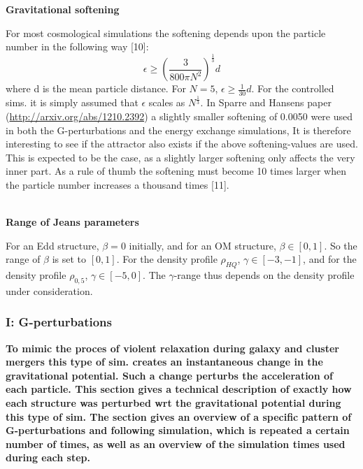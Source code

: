 \centerline{\textbf{Gravitational softening}} 
For most cosmological simulations the softening depends upon the particle number in the following way [10]:
\begin{equation}
\epsilon \geq (\frac{3}{800\pi N^2})^{\frac{1}{3}}d  
\end{equation}
where d is the mean particle distance. For $N=5$, $\epsilon \geq \frac{1}{30}d$. For the controlled sims. it is simply assumed that $\epsilon$ scales as $N^{\frac{1}{3}}$. In Sparre and Hansens paper (\url{http://arxiv.org/abs/1210.2392}) a slightly smaller softening of 0.0050 were used in both the G-perturbations and the energy exchange simulations, It is therefore interesting to see if the attractor also exists if the above softening-values are used. This is expected to be the case, as a slightly larger softening only affects the very inner part. As a rule of thumb the softening must become 10 times larger when the particle number increases a thousand times [11]. \\ \\

\centerline{\textbf{Range of Jeans parameters}} 
For an Edd structure, $\beta = 0$ initially, and for an OM structure, $\beta \in [0,1]$. So the range of $\beta$ is set to $[0,1]$. For the density profile $\rho_{HQ}$, $\gamma \in [-3,-1]$, and for the density profile $\rho_{0,5}$, $\gamma \in [-5,0]$. The $\gamma$-range thus depends on the density profile under consideration.

\subsubsection{I: G-perturbations}
\textbf{To mimic the proces of violent relaxation during galaxy and cluster mergers this type of sim. creates an instantaneous change in the gravitational potential. Such a change perturbs the acceleration of each particle. This section gives a technical description of exactly how each structure was perturbed wrt the gravitational potential during this type of sim. The section gives an overview of a specific pattern of G-perturbations and following simulation, which is repeated a certain number of times, as well as an overview of the simulation times used during each step.} \\ \\

